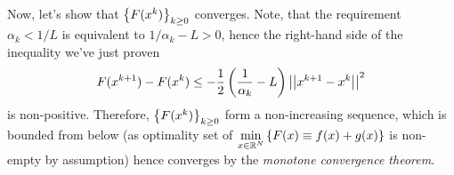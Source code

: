 \documentclass[8pt]{article} %
\begin{document}
\begin{enumerate}[label=\bfseries Problem \arabic*.]
\begin{enumerate}[label=(\alph*)]
				Now, let's show that $\left\{F(x^k)\right\}_{k\geq0}$ converges. Note, that the requirement $\alpha_k<1/L$ is equivalent
				to $1/\alpha_k-L>0$, hence the right-hand side of the inequality we've just proven
				\[F(x^{k+1})-F(x^k)\leq-\frac{1}{2}\left(\frac{1}{\alpha_k}-L\right)\left|\left|x^{k+1}-x^k\right|\right|^2\]
				is non-positive. Therefore, $\left\{F(x^k)\right\}_{k\geq0}$ form a non-increasing sequence, which is bounded
				from below (as optimality set of $\min_{x\in\mathbb{R}^N}\mycbra{F(x)\equiv f(x)+g(x)}$ is non-empty by assumption)
				hence converges by the {\it monotone convergence theorem}.
		\end{enumerate}
\end{enumerate}
\end{document}
